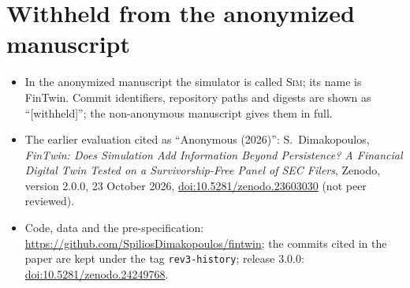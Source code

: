 \documentclass[preprint,12pt]{elsarticle}
\begin{document}
\section*{Withheld from the anonymized manuscript}
\begin{itemize}
\item In the anonymized manuscript the simulator is called \textsc{Sim}; its name is FinTwin. Commit identifiers, repository paths and digests are shown as ``[withheld]''; the non-anonymous manuscript gives them in full.
\item The earlier evaluation cited as ``Anonymous (2026)'': S.~Dimakopoulos, \emph{FinTwin: Does Simulation Add Information Beyond Persistence? A Financial Digital Twin Tested on a Survivorship-Free Panel of SEC Filers}, Zenodo, version 2.0.0, 23 October 2026, \href{https://doi.org/10.5281/zenodo.23603030}{doi:10.5281/zenodo.23603030} (not peer reviewed).
\item Code, data and the pre-specification: \url{https://github.com/SpiliosDimakopoulos/fintwin}; the commits cited in the paper are kept under the tag \texttt{rev3-history}; release 3.0.0: \href{https://doi.org/10.5281/zenodo.24249768}{doi:10.5281/zenodo.24249768}.
\end{itemize}
\end{document}
